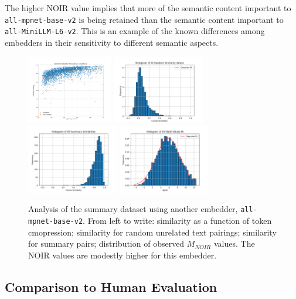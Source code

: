 \documentclass{article}
\begin{document}
{The higher NOIR value implies that more of the semantic content important to \texttt{all-mpnet-base-v2} is being retained than the semantic content important to \texttt{all-MiniLLM-L6-v2}.  
This is an example of the known differences among embedders in their sensitivity to different semantic aspects.

\begin{figure}
	\centering
	\includegraphics[height=3cm]{mpnet_Summary_Similarity_versus_Length_Compression.png}
	\includegraphics[height=3cm]{mpnet_Histogram_of_All_Random_Similarity_Values.png}
	\includegraphics[height=3cm]{mpnet_Histogram_of_All_Summary_Similarities.png }
	\includegraphics[height=3cm]{mpnet_Histogram_of_All_SQUE_Values_Fit.png}
	\caption{Analysis of the summary dataset using another embedder, \texttt{all-mpnet-base-v2}.  From left to write: similarity as a function of token cmopression; similarity for random unrelated text pairings; similarity for summary pairs; distribution of observed $M_{NOIR}$ values.  The NOIR values are modestly higher for this embedder.}
	\label{fig:mpnet}
\end{figure}


\subsection{Comparison to Human Evaluation}

}
\end{document}
